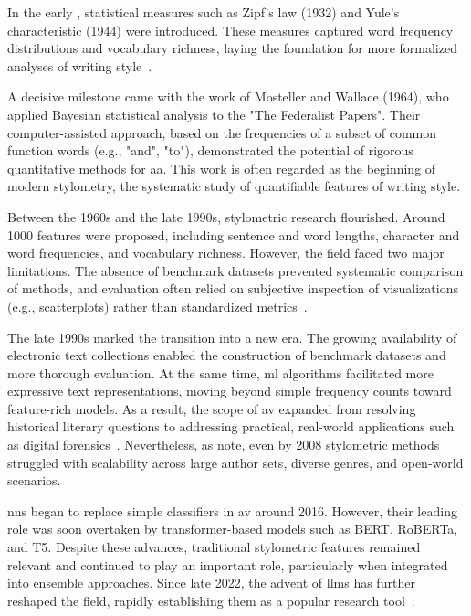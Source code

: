 
In the early , statistical measures such as Zipf's law (1932) and Yule's characteristic (1944) were introduced. 
These measures captured word frequency distributions and vocabulary richness, laying the foundation for more formalized analyses of writing style~\citep{neal_surveying_2018,stamatatos_survey_2009}.

A decisive milestone came with the work of Mosteller and Wallace (1964), who applied Bayesian statistical analysis to the "The Federalist Papers".
Their computer-assisted approach, based on the frequencies of a subset of common function words (e.g., "and", "to"), demonstrated the potential of rigorous quantitative methods for \ac{aa}. 
This work is often regarded as the beginning of modern stylometry, the systematic study of quantifiable features of writing style.

Between the 1960s and the late 1990s, stylometric research flourished.
Around \num{1000} features were proposed, including sentence and word lengths, character and word frequencies, and vocabulary richness. 
However, the field faced two major limitations. 
The absence of benchmark datasets prevented systematic comparison of methods, and evaluation often relied on subjective inspection of visualizations (e.g., scatterplots) rather than standardized metrics~\citep{stamatatos_survey_2009}.

The late 1990s marked the transition into a new era. 
The growing availability of electronic text collections enabled the construction of benchmark datasets and more thorough evaluation. 
At the same time, \ac{ml} algorithms facilitated more expressive text representations, moving beyond simple frequency counts toward feature-rich models. 
As a result, the scope of \ac{av} expanded from resolving historical literary questions to addressing practical, real-world applications such as digital forensics~\citep{stamatatos_survey_2009}. 
Nevertheless, as \citet{abbasi_writeprints_2008} note, even by 2008 stylometric methods struggled with scalability across large author sets, diverse genres, and open-world scenarios.

\acp{nn} began to replace simple classifiers in \ac{av} around 2016. 
However, their leading role was soon overtaken by transformer-based models such as BERT, RoBERTa, and T5. 
Despite these advances, traditional stylometric features remained relevant and continued to play an important role, particularly when integrated into ensemble approaches. 
Since late 2022, the advent of \acp{llm} has further reshaped the field, rapidly establishing them as a popular research tool~\citep{schmidt_llm_av_latin_24}.
